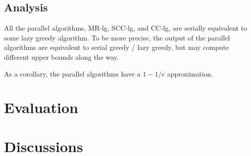 \documentclass{article}
\newcommand{\mrlz}{MR-lg}
\newcommand{\scclz}{SCC-lg}
\newcommand{\cclz}{CC-lg}
\begin{document}
\subsection{Analysis}
All the parallel algorithms, \mrlz{}, \scclz{}, and \cclz{}, are serially equivalent to some lazy greedy algorithm.
To be more precise, the output of the parallel algorithms are equivalent to serial greedy / lazy greedy, but may compute different upper bounds along the way.

As a corollary, the parallel algorithms have a $1-1/e$ approximation.
\section{Evaluation}
\label{sec:evaluation}

\section{Discussions}
\label{sec:discussions}

 




\end{document}
